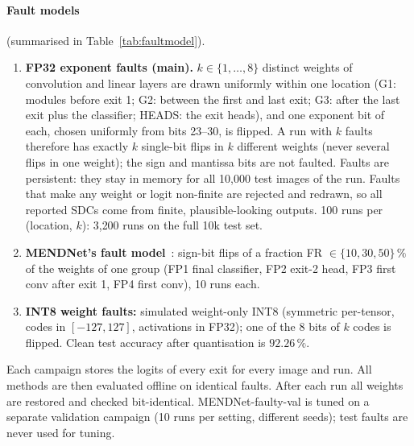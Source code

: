 \documentclass[10pt,a4paper]{article}
\begin{document}
\paragraph{Fault models} (summarised in Table~\ref{tab:faultmodel}).
\begin{enumerate}
  \item \textbf{FP32 exponent faults (main).} $k\in\{1,\dots,8\}$ distinct weights of convolution and
        linear layers are drawn uniformly within one location (G1: modules before exit 1; G2: between
        the first and last exit; G3: after the last exit plus the classifier; HEADS: the exit heads), and
        one exponent bit of each, chosen uniformly from bits 23--30, is flipped. A run with $k$ faults therefore
        has exactly $k$ single-bit flips in $k$ different weights (never several flips in one weight); the
        sign and mantissa bits are not faulted. Faults are persistent: they stay in memory for all
        10{,}000 test images of the run. Faults that make any weight or logit
        non-finite are rejected and redrawn, so all reported SDCs come from finite, plausible-looking
        outputs. 100 runs per (location, $k$): 3{,}200 runs on the full 10k test set.
  \item \textbf{MENDNet's fault model}~\cite{mendnet}: sign-bit flips of a fraction FR $\in\{10,30,50\}\,\%$
        of the weights of one group (FP1 final classifier, FP2 exit-2 head, FP3 first conv after exit 1,
        FP4 first conv), 10 runs each.
  \item \textbf{INT8 weight faults:} simulated weight-only INT8 (symmetric per-tensor, codes in
        $[-127,127]$, activations in FP32); one of the 8 bits of $k$ codes is flipped. Clean test
        accuracy after quantisation is $92.26\,\%$.
\end{enumerate}
Each campaign stores the logits of every exit for every image and run. All methods are then evaluated
offline on identical faults. After each run all weights are restored and checked bit-identical.
MENDNet-faulty-val is tuned on a separate validation campaign (10 runs per setting, different seeds);
test faults are never used for tuning.
\end{document}
